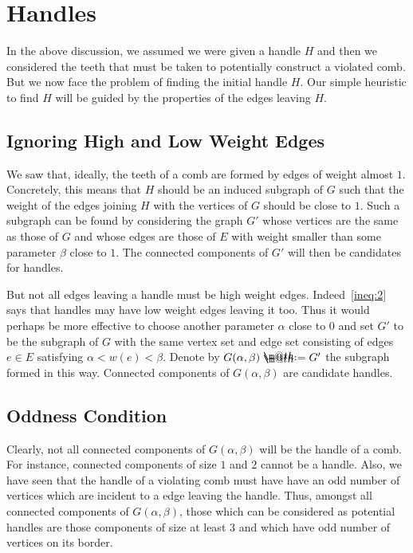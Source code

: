 \documentclass[11pt, letterpaper]{amsart}
\makeatletter
\theoremstyle{plain}
\theoremstyle{definition}
\theoremstyle{remark}
\newcommand*{\coloneqq}{\mathrel{\rlap{%
           \raisebox{0.3ex}{$\m@th\cdot$}}%
           \raisebox{-0.3ex}{$\m@th\cdot$}}%
           =}
\makeatother
\begin{document}
\section{Handles}
In the above discussion, we assumed we were given a handle $H$ and then we
considered the teeth that must be taken to potentially construct a violated
comb.  But we now face the problem of finding the initial handle $H$. Our
simple heuristic to find $H$ will be guided by the properties of the edges
leaving $H$.

\subsection{Ignoring High and Low Weight Edges}
We saw that, ideally, the teeth of a comb are formed by edges of weight almost
$1$. Concretely, this means that $H$ should be an induced subgraph of $G$ such
that the weight of the edges joining $H$ with the vertices of $G$ should be
close to $1$. Such a subgraph can be found by considering the graph $G'$ whose
vertices are the same as those of $G$ and whose edges are those of $E$ with
weight smaller than some parameter $\beta$ close to $1$. The connected
components of $G'$ will then be candidates for handles.

But not all edges leaving a handle must be high weight edges.
Indeed~\eqref{ineq:2} says that handles may have low weight edges leaving it
too. Thus it would perhaps be more effective to choose another parameter
$\alpha$ close to $0$ and set $G'$ to be the subgraph of $G$ with the same
vertex set and edge set consisting of edges $e \in E$ satisfying $\alpha < w(e)
< \beta$. Denote by $G(\alpha,\beta) \coloneqq G'$ the subgraph formed in this
way. Connected components of $G(\alpha,\beta)$ are candidate handles.

\subsection{Oddness Condition}
Clearly, not all connected components of $G(\alpha,\beta)$ will be the handle
of a comb. For instance, connected components of size $1$ and $2$ cannot be a
handle. Also, we have seen that the handle of a violating comb must have have
an odd number of vertices which are incident to a edge leaving the handle.
Thus, amongst all connected components of $G(\alpha,\beta)$, those which can be
considered as potential handles are those components of size at least $3$ and
which have odd number of vertices on its border.
\end{document}
